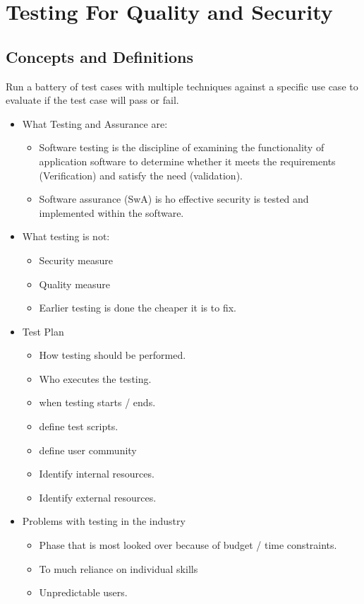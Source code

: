\documentclass[12pt]{article}
\begin{document}
\section{Testing For Quality and Security}
\subsection{Concepts and Definitions}
Run a battery of test cases with multiple techniques against a specific use case
to evaluate if the test case will pass or fail.
\begin{itemize}
	\item What Testing and Assurance are:
		\begin{itemize}
			\item Software testing is the discipline of examining the functionality
				of application software to determine whether it meets the
				requirements (Verification) and satisfy the need (validation).
			\item Software assurance (SwA) is ho effective security is tested and
				implemented within the software.
		\end{itemize}
	\item What testing is not:
		\begin{itemize}
			\item Security measure
			\item Quality measure
			\item Earlier testing is done the cheaper it is to fix.
		\end{itemize}
	\item Test Plan
		\begin{itemize}
			\item How testing should be performed.
			\item Who executes the testing.
			\item when testing starts / ends.
			\item define test scripts.
			\item define user community
			\item Identify internal resources.
			\item Identify external resources.
		\end{itemize}
	\item Problems with testing in the industry
		\begin{itemize}
			\item Phase that is most looked over because of budget / time constraints.
			\item To much reliance on individual skills
			\item Unpredictable users.
		\end{itemize}
\end{itemize}
\end{document}
